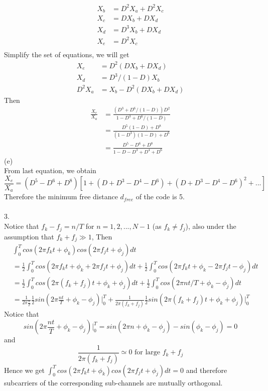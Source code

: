 \documentclass [12pt] {article}
\begin{document}
\begin{spacing}{1.5}
\begin{align*}
X_b &= D^2 X_a + D^2 X_c\\
X_c &= D X_b + D X_d \\
X_d &= D^3 X_b + D X_d \\
X_e &= D^2 X_c\\
\end{align*}
Simplify the set of equations, we will get 
\begin{align*}
X_e &= D^2(D X_b +D X_d) \\
X_d &= D^3/(1-D) X_b \\
D^2 X_a &= X_b - D^2(D X_b + D X_d)
\end{align*}
Then 
\begin{align*}
\frac{X_e}{X_a} &= \frac{(D^3+D^6/(1-D))D^2}{1-D^3 + D^6/(1-D)}\\
&= \frac{D^5(1-D) + D^8}{(1-D^3)(1-D)+D^6}\\
&= \frac{D^5-D^6+D^8}{1-D-D^3+D^4+D^6}
\end{align*}
(e) \\
From last equation, we obtain 
$$\frac{X_e}{X_a} = (D^5 -D^6 + D^8) [1+(D+D^3-D^4-D^6) + (D+D^3-D^4-D^6)^2 + ...] $$
Therefore the minimum free distance $d_{free}$ of the code is 5.\\
~\\
3. \\
Notice that $f_k - f_j = n/T$ for $n = 1,2,..., N-1$ (as $f_k \neq f_j$), also under the assumption that $f_k+f_j \gg 1$, Then
\begin{align*}
&\int_0^T cos(2\pi f_k t + \phi_k)cos(2\pi f_j t +\phi_j) dt\\
&=\frac{1}{2}\int_0^T cos(2\pi f_k t + \phi_k + 2\pi f_j t +\phi_j) dt +\frac{1}{2} \int_0^T cos(2\pi f_k t + \phi_k - 2\pi f_j t -\phi_j) dt\\
&=\frac{1}{2}\int_0^T cos(2\pi (f_k + f_j) t + \phi_k +\phi_j) dt +\frac{1}{2} \int_0^T cos(2\pi nt/T + \phi_k -\phi_j) dt\\
&=\frac{1}{2\pi\frac{n}{T}} \frac{1}{2} sin(2\pi\frac{nt}{T} + \phi_k - \phi_j) \big|_0^T + \frac{1}{2\pi(f_k + f_j)}\frac{1}{2} sin(2\pi (f_k + f_j) t + \phi_k +\phi_j)\big|_0^T
\end{align*}
Notice that $$ sin(2\pi\frac{nt}{T} + \phi_k - \phi_j) \big|_0^T  = sin(2\pi n + \phi_k - \phi_j) - sin( \phi_k - \phi_j) = 0$$
and $$ \frac{1}{2\pi(f_k + f_j)} \simeq 0 \text{ for large } f_k+f_j$$
Hence we get $\int_0^T cos(2\pi f_k t + \phi_k)cos(2\pi f_j t +\phi_j) dt = 0$ and therefore subcarriers of the corresponding sub-channels are mutually orthogonal.\\

\end{spacing}
\end{document}
